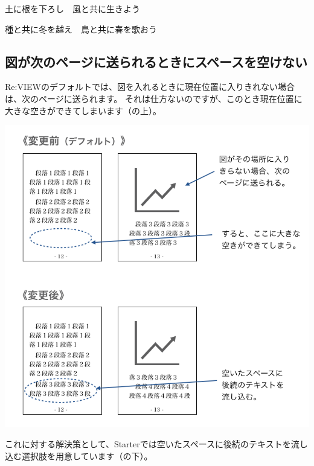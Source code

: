 \starterresult
\begin{starterlead}
土に根を下ろし　風と共に生きよう

種と共に冬を越え　鳥と共に春を歌おう
\end{starterlead}
\endstarterresult

\subsection*{図が次のページに送られるときにスペースを空けない}
\label{sec:1-1-15}

Re:VIEWのデフォルトでは、図を入れるときに現在位置に入りきれない場合は、次のページに送られます。
それは仕方ないのですが、このとき現在位置に大きな空きができてしまいます（の上）。

\begin{reviewimage}%
\includegraphics[width=0.8\maxwidth]{./images/chap01-starter/figure_heretop.png}%
\label{image:chap01-starter:figure_heretop}
\end{reviewimage}

これに対する解決策として、Starterでは空いたスペースに後続のテキストを流し込む選択肢を用意しています（の下）。

